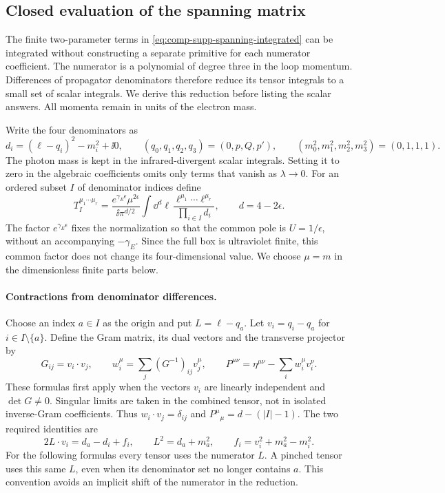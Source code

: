 \subsection{Closed evaluation of the spanning matrix}
\label{sec:comp-supp-box-tensor}
The finite two-parameter terms in
\eqref{eq:comp-supp-spanning-integrated} can be integrated without
constructing a separate primitive for each numerator coefficient.
The numerator is a polynomial of degree three in the loop momentum.
Differences of propagator denominators therefore reduce its tensor
integrals to a small set of scalar integrals. We derive this reduction
before listing the scalar answers. All momenta remain in units of the
electron mass.

Write the four denominators as
\begin{equation}
 d_i=(\ell-q_i)^2-m_i^2+\ii0,\qquad
 (q_0,q_1,q_2,q_3)=(0,p,Q,p'),\qquad
 (m_0^2,m_1^2,m_2^2,m_3^2)=(0,1,1,1).
\end{equation}
The photon mass is kept in the infrared-divergent scalar integrals.
Setting it to zero in the algebraic coefficients omits only terms
that vanish as $\lambda\to0$. For an ordered subset $I$ of denominator
indices define
\begin{equation}
 T_I^{\mu_1\cdots\mu_r}
 =\frac{e^{\gamma_E\epsilon}\mu^{2\epsilon}}{\ii\pi^{d/2}}
   \int\dd^d\ell\,
   \frac{\ell^{\mu_1}\cdots\ell^{\mu_r}}
        {\prod_{i\in I}d_i},\qquad d=4-2\epsilon.
 \label{eq:comp-supp-box-tensor-definition}
\end{equation}
The factor $e^{\gamma_E\epsilon}$ fixes the normalization so that
the common pole is $U=1/\epsilon$, without an accompanying
$-\gamma_E$. Since the full box is ultraviolet finite, this common
factor does not change its four-dimensional value. We choose
$\mu=m$ in the dimensionless finite parts below.

\paragraph{Contractions from denominator differences.}
Choose an index $a\in I$ as the origin and put
$L=\ell-q_a$. Let $v_i=q_i-q_a$ for $i\in I\setminus\{a\}$.
Define the Gram matrix, its dual vectors and the transverse projector
by
\begin{equation}
 G_{ij}=v_i\cdot v_j,\qquad
 w_i^\mu=\sum_j(G^{-1})_{ij}v_j^\mu,\qquad
 P^{\mu\nu}=\eta^{\mu\nu}-\sum_iw_i^\mu v_i^\nu.
 \label{eq:comp-supp-box-projector}
\end{equation}
These formulas first apply when the vectors $v_i$ are linearly
independent and $\det G\ne0$. Singular limits are taken in the
combined tensor, not in isolated inverse-Gram coefficients.
Thus $w_i\cdot v_j=\delta_{ij}$ and
$P^\mu{}_{\mu}=d-(|I|-1)$. The two required identities are
\begin{equation}
 2L\cdot v_i=d_a-d_i+f_i,\qquad
 L^2=d_a+m_a^2,\qquad
 f_i=v_i^2+m_a^2-m_i^2.
 \label{eq:comp-supp-box-denominator-differences}
\end{equation}
For the following formulas every tensor uses the numerator $L$.
A pinched tensor uses this same $L$, even when its denominator set
no longer contains $a$. This convention avoids an implicit shift
of the numerator in the reduction.

